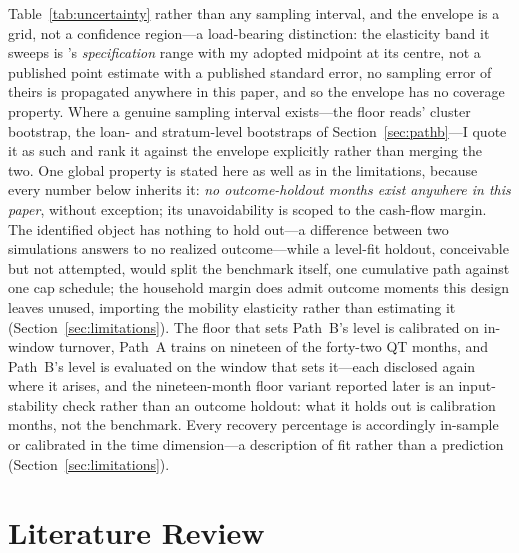 \documentclass[12pt]{article}
\begin{document}
Table~\ref{tab:uncertainty} rather than any sampling interval, and the envelope is a grid, not a confidence region---a load-bearing distinction: the elasticity band it sweeps is \citeauthor{liebersohn2024}'s \emph{specification} range with my adopted midpoint at its centre, not a published point estimate with a published standard error, no sampling error of theirs is propagated anywhere in this paper, and so the envelope has no coverage property. Where a genuine sampling interval exists---the floor reads' cluster bootstrap, the loan- and stratum-level bootstraps of Section~\ref{sec:pathb}---I quote it as such and rank it against the envelope explicitly rather than merging the two. One global property is stated here as well as in the limitations, because every number below inherits it: \emph{no outcome-holdout months exist anywhere in this paper}, without exception; its unavoidability is scoped to the cash-flow margin. The identified object has nothing to hold out---a difference between two simulations answers to no realized outcome---while a level-fit holdout, conceivable but not attempted, would split the benchmark itself, one cumulative path against one cap schedule; the household margin does admit outcome moments this design leaves unused, importing the mobility elasticity rather than estimating it (Section~\ref{sec:limitations}). The floor that sets Path~B's level is calibrated on in-window turnover, Path~A trains on nineteen of the forty-two QT months, and Path~B's level is evaluated on the window that sets it---each disclosed again where it arises, and the nineteen-month floor variant reported later is an input-stability check rather than an outcome holdout: what it holds out is calibration months, not the benchmark. Every recovery percentage is accordingly in-sample or calibrated in the time dimension---a description of fit rather than a prediction (Section~\ref{sec:limitations}).

\section{Literature Review}\label{sec:lit}
\end{document}
